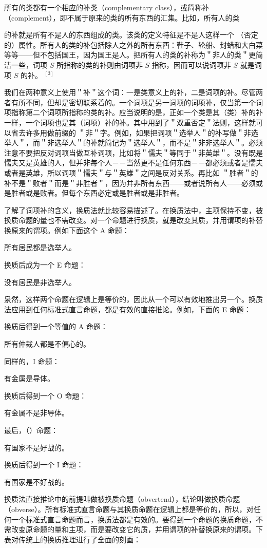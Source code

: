 所有的类都有一个相应的补类（complementary class），或简称补 （complement），即不属于原来的类的所有东西的汇集。比如，所有人的类

的补就是所有不是人的东西组成的类。该类的定义特征是不是人这样一个 （否定的）属性。所有人的类的补包括除人之外的所有东西：鞋子、轮船、封蜡和大白菜等等——但不包括国王，因为国王是人。把所有人的类的补称为＂非人的类＂更简洁一些，词项 $S$ 所指称的类的补则由词项非 $S$ 指称，因而可以说词项非 $S$ 就是词项 $S$ 的补。 ${ }^{[3]}$

我们在两种意义上使用＂补＂这个词：一是类意义上的补，二是词项的补。尽管两者有所不同，但却是密切联系着的。一个词项是另一词项的词项补，仅当第一个词项指称第二个词项所指称的类的补。应当说明的是，正如一个类是其（类）补的补一样，一个词项也是其（词项）补的补。其中用到了＂双重否定＂法则，这样就可以省去许多用做前缀的 ＂非＂字。例如，如果把词项＂选举人＂的补写做＂非选举人＂，而＂非选举人＂的补就简记为＂选举人＂，而不是＂非非选举人＂。必须注意不要把反对词项当做互补词项，比如将＂懦夫＂等同于＂非英雄＂。没有既是懦夫又是英雄的人，但并非每个人－－当然更不是任何东西－－都必须或者是懦夫或者是英雄，所以词项＂懦夫＂与＂英雄＂之间是反对关系。再比如 ＂胜者＂的补不是＂败者＂而是＂非胜者＂，因为并非所有东西——或者说所有人——必须或是胜者或是败者。但每个东西必定或是胜者或是非胜者。

了解了词项补的含义，换质法就比较容易描述了。在换质法中，主项保持不变，被换质命题的量也不需改变。对一个命题进行换质，就是改变其质，并用谓项的补替换原来的谓项。例如下面这个 A 命题：

所有居民都是选举人。

换质后成为一个 E 命题：

没有居民是非选举人。

泉然，这样两个命题在逻辑上是等价的，因此从一个可以有效地推出另一个。换质法应用到任何标准式直言命题，都是有效的直接推论。例如，下面的 E 命题：

换质后得到一个等值的 A 命题：

所有仲裁人都是不偏心的。

同样的，I 命题：

有金属是导体。

换质后得到一个 O 命题：

有金属不是非导体。

最后，（）命题：

有国家不是好战的。

换质后得到一个 I 命题：

有国家是不好战的。

换质法直接推论中的前提叫做被换质命题（obvertend），结论叫做换质命题（obverse）。所有标准式直言命题与其换质命题在逻辑上都是等价的，所以，对任何一个标准式直言命题而言，换质法都是有效的。要得到一个命题的换质命题，不需改变原命题的量和主项，而是要改变它的质，并用谓项的补替换原来的谓项。下表对传统上的换质推理进行了全面的刻画：

